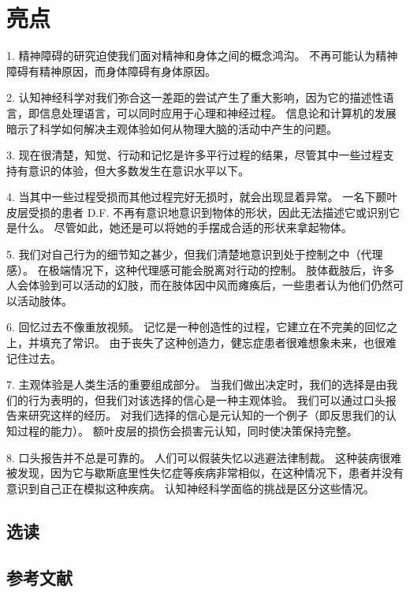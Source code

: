 \section{亮点}

1. 精神障碍的研究迫使我们面对精神和身体之间的概念鸿沟。 不再可能认为精神障碍有精神原因，而身体障碍有身体原因。 

2. 认知神经科学对我们弥合这一差距的尝试产生了重大影响，因为它的描述性语言，即信息处理语言，可以同时应用于心理和神经过程。 信息论和计算机的发展暗示了科学如何解决主观体验如何从物理大脑的活动中产生的问题。 

3. 现在很清楚，知觉、行动和记忆是许多平行过程的结果，尽管其中一些过程支持有意识的体验，但大多数发生在意识水平以下。 

4. 当其中一些过程受损而其他过程完好无损时，就会出现显着异常。 一名下颞叶皮层受损的患者 D.F. 不再有意识地意识到物体的形状，因此无法描述它或识别它是什么。 尽管如此，她还是可以将她的手摆成合适的形状来拿起物体。 

5. 我们对自己行为的细节知之甚少，但我们清楚地意识到处于控制之中（代理感）。 在极端情况下，这种代理感可能会脱离对行动的控制。 肢体截肢后，许多人会体验到可以活动的幻肢，而在肢体因中风而瘫痪后，一些患者认为他们仍然可以活动肢体。 

6. 回忆过去不像重放视频。 记忆是一种创造性的过程，它建立在不完美的回忆之上，并填充了常识。 由于丧失了这种创造力，健忘症患者很难想象未来，也很难记住过去。 

7. 主观体验是人类生活的重要组成部分。 当我们做出决定时，我们的选择是由我们的行为表明的，但我们对该选择的信心是一种主观体验。 我们可以通过口头报告来研究这样的经历。 对我们选择的信心是元认知的一个例子（即反思我们的认知过程的能力）。 额叶皮层的损伤会损害元认知，同时使决策保持完整。 

8. 口头报告并不总是可靠的。 人们可以假装失忆以逃避法律制裁。 这种装病很难被发现，因为它与歇斯底里性失忆症等疾病非常相似，在这种情况下，患者并没有意识到自己正在模拟这种疾病。 认知神经科学面临的挑战是区分这些情况。

\subsection{选读}
\subsection{参考文献}